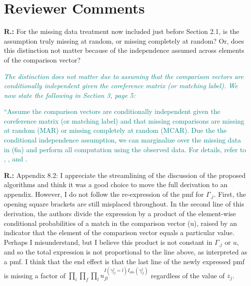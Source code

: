 \documentclass[letterpaper, parskip]{scrartcl}
\newcommand{\pointRaised}[2]{%
	\textbf{#1.\theresponsectr:} #2
}
\newcounter{responsectr}[section]     %
\newcommand{\reply}[1]{%
	\refstepcounter{responsectr}%
		\begin{tcolorbox}
			\itshape #1
		\end{tcolorbox}
}
\begin{document}
\setcounter{responsectr}{0}
\section{Reviewer Comments}

	\pointRaised{R}{%
	For the missing data treatment now included just before Section 2.1, is the assumption truly missing at random, or missing completely at random? Or, does this distinction not matter because of the independence assumed across elements of the comparison vector?}
	
	
	\reply{\textcolor{teal}{The distinction does not matter due to assuming that the comparison vectors are conditionally independent given the coreference matrix (or matching label). We now state the following in Section 3, page 5:}
	
	\textcolor{teal}{``Assume the comparison vectors are conditionally independent given the coreference matrix (or matching label) and that missing comparisons are  missing at random (MAR) or missing completely at random (MCAR). Due the the conditional independence assumption, we can marginalize over the missing data in (6a) and perform all computation using the observed data. For details, refer to \cite[Section 6.2]{LittleRubin2002}, \cite[Section 3.1]{sadinle_detecting_2014}, and \citep[Section 4.2]{sadinle_bayesian_2017}.}
	

	}
	


	\pointRaised{R}{%
	Appendix 8.2: I appreciate the streamlining of the discussion of the proposed algorithms and think it was a good choice to move the full derivation to an appendix. However, I do not follow the re-expression of the pmf for $\Gamma_{.j}$. First, the opening square brackets are still misplaced
	throughout. In the second line of this derivation, the authors divide the expression by a product of the element-wise conditional probabilities of a match in the comparison vector (u), raised by an indicator that the element of the comparison vector equals a particular value. Perhaps I misunderstand, but I believe this product is not constant in $\Gamma_{.j}$ or $u$, and so the total expression is not proportional to the line above, as interpreted as a pmf. I think that the end effect is that the last line of the newly expressed pmf is missing a factor of $\prod_i \prod_f \prod_l u_{fl}^{I(\gamma_{ij}^f = l) I_{obs}(\gamma_{ij}^f)}$ regardless of the value of $z_j$.}
	
	
\end{document}
